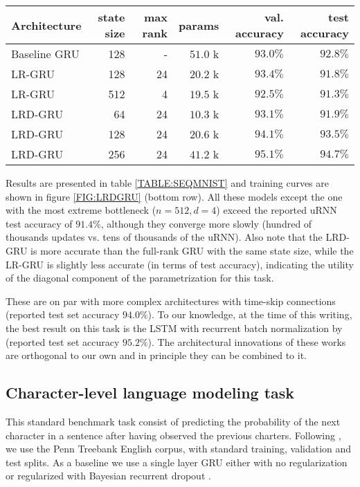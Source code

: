 \documentclass[11pt,a4paper]{article}
\begin{document}
\begin{table*}[t]
\caption{Sequential permuted MNIST results}
\centering
\begin{tabular}{lrrrrr}
\toprule
Architecture & state size & max rank & params & val. accuracy & test accuracy \\
\midrule
Baseline GRU & 128 & - & $51.0$ k & $93.0\%$ & $92.8\%$ \\
LR-GRU & 128 & 24 & $20.2$ k & $93.4\%$ & $91.8\%$ \\
LR-GRU & 512 & 4 & $19.5$ k & $92.5\%$ & $91.3\%$ \\
LRD-GRU & 64 & 24 & $10.3$ k & $93.1\%$ & $91.9\%$ \\
LRD-GRU & 128 & 24 & $20.6$ k & $94.1\%$ & $93.5\%$ \\
LRD-GRU & 256 & 24 & $41.2$ k & $\mathbf{95.1\%}$ & $\mathbf{94.7\%}$ \\
\bottomrule
\end{tabular}
\label{TABLE:SEQMNIST}
\end{table*}

Results are presented in table \ref{TABLE:SEQMNIST} and training curves are shown in figure \ref{FIG:LRDGRU} (bottom row). All these models except the one with the most extreme bottleneck ($n=512,d=4$) exceed the reported uRNN test accuracy of $91.4\%$, although they converge more slowly (hundred of thousands updates vs. tens of thousands of the uRNN). Also note that the LRD-GRU is more accurate than the full-rank GRU with the same state size, while the LR-GRU is slightly less accurate (in terms of test accuracy), indicating the utility of the diagonal component of the parametrization for this task.

These are on par with more complex architectures with time-skip connections \cite{zhang2016} (reported test set accuracy $94.0\%$). To our knowledge, at the time of this writing, the best result on this task is the LSTM with recurrent batch normalization by  (reported test set accuracy $95.2\%$). The architectural innovations of these works are orthogonal to our own and in principle they can be combined to it.

\subsection{Character-level language modeling task}

This standard benchmark task consist of predicting the probability of the next character in a sentence after having observed the previous charters. Following , we use the Penn Treebank English corpus, with standard training, validation and test splits.
As a baseline we use a single layer GRU either with no regularization or regularized with   Bayesian recurrent dropout \cite{Gal2015}.
\end{document}
